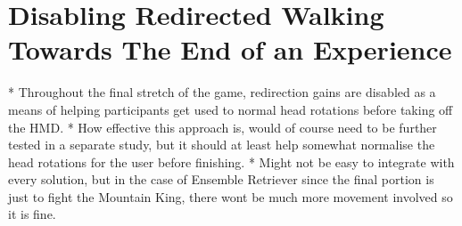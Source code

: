 \section{Disabling Redirected Walking Towards The End of an Experience}
* Throughout the final stretch of the game, redirection gains are disabled as a means of helping participants get used to normal head rotations before taking off the HMD.
* How effective this approach is, would of course need to be further tested in a separate study, but it should at least help somewhat normalise the head rotations for the user before finishing.
* Might not be easy to integrate with every solution, but in the case of Ensemble Retriever since the final portion is just to fight the Mountain King, there wont be much more movement involved so it is fine. 
